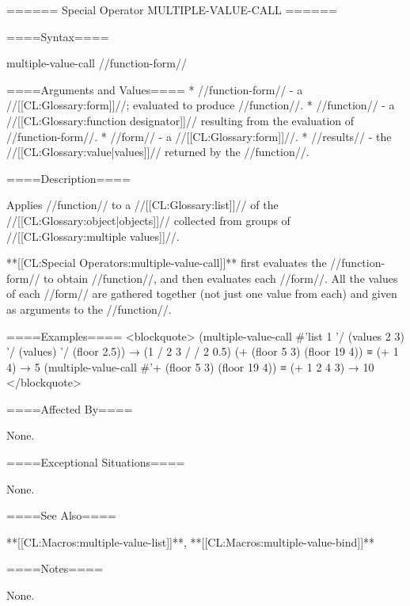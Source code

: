 ====== Special Operator MULTIPLE-VALUE-CALL ======

====Syntax====

\DefspecWithValues multiple-value-call {//function-form// } {}

====Arguments and Values====
  * //function-form// - a //[[CL:Glossary:form]]//; evaluated to produce //function//.
  * //function// - a //[[CL:Glossary:function designator]]// resulting from the evaluation of //function-form//.
  * //form// - a //[[CL:Glossary:form]]//.
  * //results// - the //[[CL:Glossary:value|values]]// returned by the //function//.

====Description====

Applies //function// to a //[[CL:Glossary:list]]// of the //[[CL:Glossary:object|objects]]// collected from groups of //[[CL:Glossary:multiple values]]//.

**[[CL:Special Operators:multiple-value-call]]** first evaluates the //function-form// to obtain //function//, and then evaluates each //form//. All the values of each //form// are gathered together (not just one value from each) and given as arguments to the //function//.

====Examples==== <blockquote> (multiple-value-call #'list 1 '/ (values 2 3) '/ (values) '/ (floor 2.5)) → (1 / 2 3 / / 2 0.5) (+ (floor 5 3) (floor 19 4)) ≡ (+ 1 4) → 5 (multiple-value-call #'+ (floor 5 3) (floor 19 4)) ≡ (+ 1 2 4 3) → 10 </blockquote>

====Affected By====

None.

====Exceptional Situations====

None.

====See Also====

**[[CL:Macros:multiple-value-list]]**, **[[CL:Macros:multiple-value-bind]]**

====Notes====

None.

